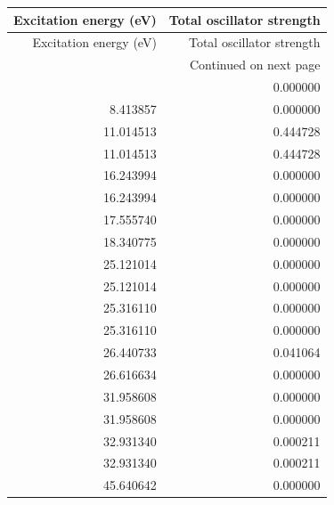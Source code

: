 \begin{longtable}{rr}
\toprule
Excitation energy (eV) & Total oscillator strength \\
\midrule
\endfirsthead
\toprule
Excitation energy (eV) & Total oscillator strength \\
\midrule
\endhead
\midrule
\multicolumn{2}{r}{Continued on next page} \\
\midrule
\endfoot
\bottomrule
\endlastfoot
8.413857 & 0.000000 \\
8.413857 & 0.000000 \\
11.014513 & 0.444728 \\
11.014513 & 0.444728 \\
16.243994 & 0.000000 \\
16.243994 & 0.000000 \\
17.555740 & 0.000000 \\
18.340775 & 0.000000 \\
25.121014 & 0.000000 \\
25.121014 & 0.000000 \\
25.316110 & 0.000000 \\
25.316110 & 0.000000 \\
26.440733 & 0.041064 \\
26.616634 & 0.000000 \\
31.958608 & 0.000000 \\
31.958608 & 0.000000 \\
32.931340 & 0.000211 \\
32.931340 & 0.000211 \\
45.640642 & 0.000000 \\
\end{longtable}

